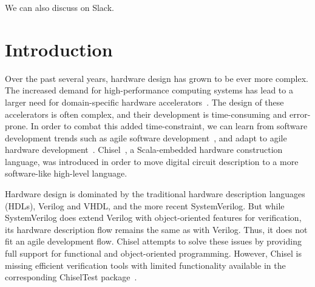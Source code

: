 \documentclass[conference]{IEEEtran}
\begin{document}
We can also discuss on Slack.

\section{Introduction}
\label{sec:introduction}

Over the past several years, hardware design has grown to be ever more complex.
The increased demand for high-performance computing systems has lead to a larger need for domain-specific hardware accelerators~\cite{domain-hw-acc:2020}.
The design of these accelerators is often complex, and their development is time-consuming and error-prone.
In order to combat this added time-constraint, we can learn from software development trends such as agile software development~\cite{agile:manifesto}, and adapt to agile hardware development~\cite{henn-patt:turing:2019}.
Chisel~\cite{chisel:dac2012}, a Scala-embedded hardware construction language, was introduced in order to move digital circuit description to a more software-like high-level language. 

Hardware design is dominated by the traditional hardware description languages (HDLs), Verilog and VHDL, and %
the more recent SystemVerilog. But while SystemVerilog  %
does extend Verilog with object-oriented features for verification, its hardware %
description flow remains the same as with Verilog. Thus, it does not fit an agile %
development flow. %
Chisel attempts to solve these issues by providing full support for %
functional and object-oriented programming. However, Chisel is missing efficient verification tools %
with limited functionality available in the corresponding ChiselTest package~\cite{chisel:tester2}. %
\end{document}
